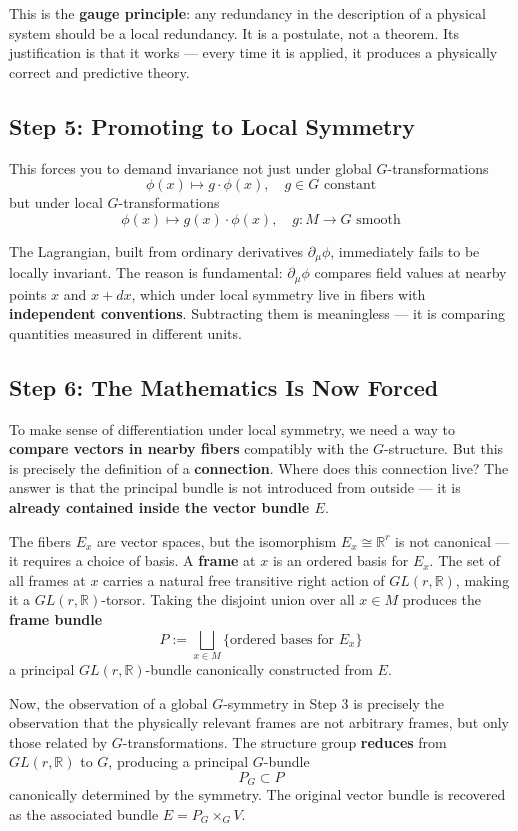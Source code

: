 \documentclass[a4paper]{article}
\begin{document}
This is the \textbf{gauge principle}: any redundancy in the description of a physical system should be a local redundancy. It is a postulate, not a theorem. Its justification is that it works --- every time it is applied, it produces a physically correct and predictive theory.

\subsection*{Step 5: Promoting to Local Symmetry}

This forces you to demand invariance not just under global $G$-transformations
\[
\phi(x) \mapsto g \cdot \phi(x), \quad g \in G \text{ constant}
\]
but under local $G$-transformations
\[
\phi(x) \mapsto g(x) \cdot \phi(x), \quad g: M \to G \text{ smooth}
\]

The Lagrangian, built from ordinary derivatives $\partial_\mu\phi$, immediately fails to be 
locally invariant. The reason is fundamental: $\partial_\mu\phi$ compares field values at 
nearby points $x$ and $x + dx$, which under local symmetry live in fibers with 
\textbf{independent conventions}. Subtracting them is meaningless — it is comparing 
quantities measured in different units.

\subsection*{Step 6: The Mathematics Is Now Forced}

To make sense of differentiation under local symmetry, we need a way to 
\textbf{compare vectors in nearby fibers} compatibly with the $G$-structure. But this is 
precisely the definition of a \textbf{connection}.
Where does this connection live? The answer is that the principal bundle is not introduced 
from outside — it is \textbf{already contained inside the vector bundle $E$}.

The fibers $E_x$ are vector spaces, but the isomorphism $E_x \cong \mathbb{R}^r$ is not 
canonical — it requires a choice of basis. A \textbf{frame} at $x$ is an ordered basis for 
$E_x$. The set of all frames at $x$ carries a natural free transitive right action of 
$GL(r, \mathbb{R})$, making it a $GL(r,\mathbb{R})$-torsor. Taking the disjoint union over 
all $x \in M$ produces the \textbf{frame bundle}
\[
P := \bigsqcup_{x \in M} \{\text{ordered bases for } E_x\}
\]
a principal $GL(r, \mathbb{R})$-bundle canonically constructed from $E$.

Now, the observation of a global $G$-symmetry in Step 3 is precisely the observation that 
the physically relevant frames are not arbitrary frames, but only those related by 
$G$-transformations. The structure group \textbf{reduces} from $GL(r, \mathbb{R})$ to $G$, 
producing a principal $G$-bundle
\[
P_G \subset P
\]
canonically determined by the symmetry. The original vector bundle is recovered as the 
associated bundle $E = P_G \times_G V$.
\end{document}
